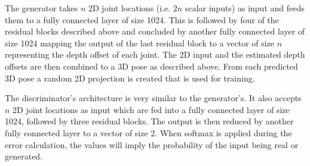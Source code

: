 The generator takes $n$ 2D joint locations (i.e. $2n$ scalar inputs) as input and feeds them to a fully connected layer of size 1024.
This is followed by four of the residual blocks described above and concluded by another fully connected layer of size 1024 mapping the output of the last residual block to a vector of size $n$ representing the depth offset of each joint.
The 2D input and the estimated depth offsets are then combined to a 3D pose as described above.
From each predicted 3D pose a random 2D projection is created that is used for training.


The discriminator's architecture is very similar to the generator's. 
It also accepts $n$ 2D joint locations as input which are fed into a fully connected layer of size 1024, followed by three residual blocks.
The output is then reduced by another fully connected layer to a vector of size 2.
When softmax is applied during the error calculation, the values will imply the probability of the input being real or generated.